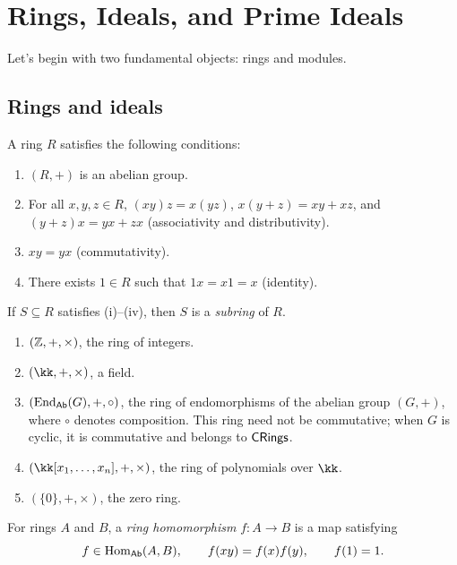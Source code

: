 \documentclass[11pt,a4paper]{article}
\begin{document}
\section*{Rings, Ideals, and Prime Ideals}
Let's begin with two fundamental objects: rings and modules.
\subsection{Rings and ideals}
\setcounter{definition}{0}\begin{definition}
A ring $R$ satisfies the following conditions:
\begin{enumerate}[label=(\roman*)]
\setcounter{enumi}{0}\item $(R,+)$ is an abelian group.
\setcounter{enumi}{1}\item For all $x,y,z\in R$, $(xy)z=x(yz)$, $x(y+z)=xy+xz$, and $(y+z)x=yx+zx$ (associativity and distributivity).
\setcounter{enumi}{2}\item $xy=yx$ (commutativity).
\setcounter{enumi}{3}\item There exists $1\in R$ such that $1x=x1=x$ (identity).
\end{enumerate}
If $S\subseteq R$ satisfies (i)--(iv), then $S$ is a \emph{subring} of $R$.
\end{definition}
\setcounter{example}{0}\begin{example}
\begin{enumerate}[label=(\roman*)]
\setcounter{enumi}{0}\item $(\mathbb{Z},+,\times)$, the ring of integers.
\setcounter{enumi}{1}\item $(\kk,+,\times)$, a field.
\setcounter{enumi}{2}\item $(\operatorname{End}_{\mathsf{Ab}}(G),+,\circ)$, the ring of endomorphisms of the abelian group $(G,+)$, where $\circ$ denotes composition. This ring need not be commutative; when $G$ is cyclic, it is commutative and belongs to $\mathsf{CRings}$.
\setcounter{enumi}{3}\item $(\kk[x_1,\ldots,x_n],+,\times)$, the ring of polynomials over $\kk$.
\setcounter{enumi}{4}\item $(\{0\},+,\times)$, the zero ring.
\end{enumerate}
\end{example}
\setcounter{definition}{1}\begin{definition}
For rings $A$ and $B$, a \emph{ring homomorphism} $f:A\to B$ is a map satisfying
\[
 f\in\operatorname{Hom}_{\mathsf{Ab}}(A,B),\qquad f(xy)=f(x)f(y),\qquad f(1)=1.
\]
\end{definition}
\end{document}
